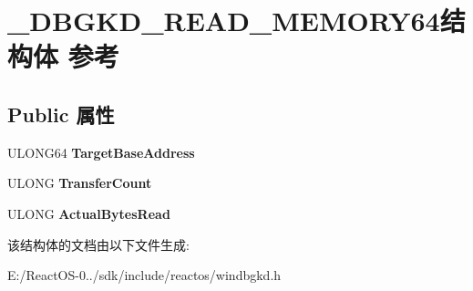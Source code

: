 \hypertarget{struct___d_b_g_k_d___r_e_a_d___m_e_m_o_r_y64}{}\section{\+\_\+\+D\+B\+G\+K\+D\+\_\+\+R\+E\+A\+D\+\_\+\+M\+E\+M\+O\+R\+Y64结构体 参考}
\label{struct___d_b_g_k_d___r_e_a_d___m_e_m_o_r_y64}
\subsection*{Public 属性}
\begin{DoxyCompactItemize}
\item 
\mbox{\label{struct___d_b_g_k_d___r_e_a_d___m_e_m_o_r_y64_ab025373b590bf796d9b7e803e8944e23}} 
U\+L\+O\+N\+G64 {\bfseries Target\+Base\+Address}
\item 
\mbox{\label{struct___d_b_g_k_d___r_e_a_d___m_e_m_o_r_y64_ab5d8ec78a5a57aceb0c75169c6610889}} 
U\+L\+O\+NG {\bfseries Transfer\+Count}
\item 
\mbox{\label{struct___d_b_g_k_d___r_e_a_d___m_e_m_o_r_y64_adf84fe9e08f8649b3356d5d84b56cd32}} 
U\+L\+O\+NG {\bfseries Actual\+Bytes\+Read}
\end{DoxyCompactItemize}


该结构体的文档由以下文件生成\+:\begin{DoxyCompactItemize}
\item 
E\+:/\+React\+O\+S-\/0../sdk/include/reactos/windbgkd.\+h\end{DoxyCompactItemize}
